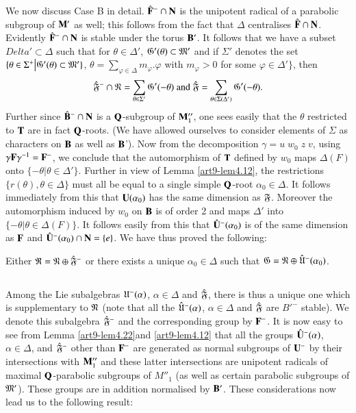 We now discuss Case B in detail. $\hat{\mathbf{F}}^- \cap \mathbf{N}$ is the unipotent radical of a parabolic subgroup of $\mathbf{M}'$ as well; this follows from the fact that $\Delta$ centralises $\hat{\mathbf{F}} \cap \mathbf{N}$. Evidently $\hat{\mathbf{F}}^- \cap \mathbf{N}$ is stable under the torus $\mathbf{B}'$. It follows that we have a subset $Delta' \subset \Delta$ such that for $\theta \in \Delta'$, $\mathfrak{G}' (\theta) \subset \mathfrak{M}'$  and if $\Sigma'$ denotes the set $\{\theta \in \Sigma^+ \big|\mathfrak{G}' (\theta) \subset \mathfrak{M}'\}$, $\theta = \sum\limits_{\varphi \in \Delta} m_\varphi. \varphi$ with $m_\varphi >0$ for some $\varphi \in \Delta'\}$, then
$$
\hat{\mathfrak{F}}^- \cap \mathfrak{N} = \sum\limits_{\theta \in \Sigma'} \mathfrak{G}' (-\theta) \text{ and } \hat{\mathfrak{F}} = \sum\limits_{\theta \in \Sigma (\Delta')} \mathfrak{G}' (-\theta).
$$
Further since $\hat{\mathbf{B}}^- \cap \mathbf{N}$ is a $\mathbf{Q}$-subgroup of $\mathbf{M}''_1$, one sees easily that the $\theta$ restricted to $\mathbf{T}$ are in fact $\mathbf{Q}$-roots. (We have allowed ourselves to consider elements of $\Sigma$ as characters on $\mathbf{B}$ as well as $\mathbf{B}$'). Now from the decomposition $\gamma = u \;w_0 \;z \;v$, using $\gamma \mathbf{F} \gamma^{-1} = \mathbf{F}^-$, we conclude that the automorphism of $\mathbf{T}$ defined by $w_0$  maps $\Delta (F)$ onto $\{- \theta \big| \theta \in \Delta'\}$. Further in view of Lemma \ref{art9-lem4.12}, the restrictions $\{r (\theta), \theta \in\Delta\}$ must all be equal to a single simple $\mathbf{Q}$-root $\alpha_0 \in \Delta$. It follows immediately from this that $\mathbf{U} (\alpha_0)$ has the same dimension as $\mathfrak{F}$. Moreover the automorphism induced by $w_0$ on $\mathbf{B}$ is of order 2 and maps $\Delta'$ into $\{- \theta \big| \theta \in \Delta (F)\}$. It follows easily from this that $\hat{\mathbf{U}}^-(\alpha_0)$ is of the same dimension as $\mathbf{F}$ and $\hat{\mathbf{U}}^- (\alpha_0) \cap \mathbf{N} = \{e\}$. We have thus proved the following:
 
\begin{lemma}\label{art9-lem4.25}
Either $\mathfrak{R} = \mathfrak{N} \oplus \hat{\mathfrak{F}}^-$ or there exists a unique $\alpha_0 \in\Delta$ such that $\mathfrak{G} = \mathfrak{N} \oplus \hat{\mathfrak{U}}^-(\alpha_0)$.
\end{lemma}

\setcounter{subsection}{25}
\subsection{}\label{art9-subsec4.26}
Among the Lie subalgebras $\mathfrak{U}^-(\alpha)$, $\alpha \in \Delta$ and $\hat{\mathfrak{F}}$, there is thus a unique one which is supplementary to $\mathfrak{N}$ (note that all the $\hat{\mathfrak{U}}^-(\alpha)$, $\alpha \in \Delta$ and $\hat{\mathfrak{F}}$ are $B'^-$ stable). We denote this subalgebra $\hat{\mathfrak{F}}^-$ and the corresponding group by $\mathbf{F}^-$. It is now easy to see from  Lemma \ref{art9-lem4.22}\pageoriginale  and  \ref{art9-lem4.12} that all the groups $\hat{\mathbf{U}}^-(\alpha)$, $\alpha \in \Delta$, and $\hat{\mathfrak{F}}^-$ other than $\mathbf{F}^-$ are generated as normal subgroups of $\mathbf{U}^-$ by their intersections with $\mathbf{M}''_1$ and these latter intersections are unipotent radicals of maximal $\mathbf{Q}$-parabolic subgroups of $M''_1$ (as well as certain parabolic subgroups of $\mathfrak{M}'$). These groups are in addition normalised by $\mathbf{B}'$. These considerations now lead us to the following result:

